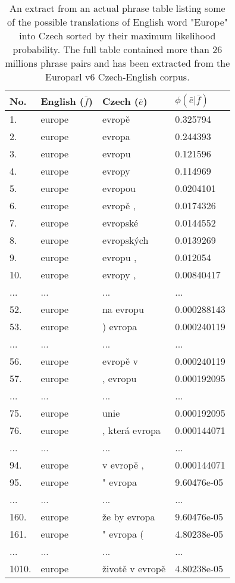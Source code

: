 \begin{table}[ht]
\centering
\begin{tabular}{ l l l l }
No. & English ($\bar{f}$) & Czech ($\bar{e}$) & $\phi(\bar{e}|\bar{f})$ \\
\hline
\hline
1. & europe & evropě & 0.325794 \\
2. & europe & evropa & 0.244393 \\
3. & europe & evropu & 0.121596 \\
4. & europe & evropy & 0.114969 \\
5. & europe & evropou & 0.0204101 \\
6. & europe & evropě , & 0.0174326 \\
7. & europe & evropské & 0.0144552 \\
8. & europe & evropských & 0.0139269 \\
9. & europe & evropu , & 0.012054 \\
10. & europe & evropy , & 0.00840417 \\
... & ... & ... & ... \\
52. & europe & na evropu & 0.000288143 \\
53. & europe & ) evropa & 0.000240119 \\
... & ... & ... & ... \\
56. & europe & evropě v & 0.000240119 \\
57. & europe & , evropu & 0.000192095 \\
... & ... & ... & ... \\
75. & europe & unie & 0.000192095 \\
76. & europe & , která evropa & 0.000144071 \\
... & ... & ... & ... \\
94. & europe & v evropě , & 0.000144071 \\
95. & europe & " evropa & 9.60476e-05 \\
... & ... & ... & ... \\
160. & europe & že by evropa & 9.60476e-05 \\
161. & europe & " evropa ( & 4.80238e-05 \\
... & ... & ... & ... \\
1010. & europe & životě v evropě & 4.80238e-05 \\
\hline
\hline
\end{tabular}
\caption{\label{phrase-table-europarl}
An extract from an actual phrase table listing some of the possible translations of English
word "Europe" into Czech sorted by their maximum likelihood probability.
The full table contained more than 26 millions phrase pairs and has been extracted
from the Europarl v6 Czech-English corpus.}
\end{table}


